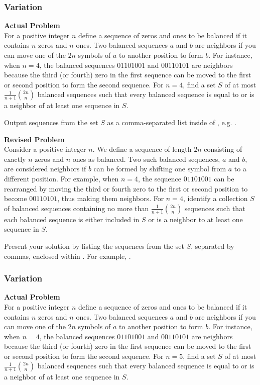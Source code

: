 \subsubsection{Variation}
\textbf{Actual Problem}\\
For a positive integer $n$ define a sequence of zeros and ones to be balanced if it contains $n$ zeros and $n$ ones. 
Two balanced sequences $a$ and $b$ are neighbors if you can move one of the $2n$ symbols of $a$ to another position to form $b$. For instance, when $n = 4$, the balanced sequences $01101001$ and $00110101$ are neighbors because the third (or fourth) zero in the first sequence can be moved to the first or second position to form the second sequence. 
For $n = 4$, find a set $S$ of at most $\frac {1}{n + 1} \binom{2n}{n}$ balanced sequences such that every balanced sequence is equal to or is a neighbor of at least one sequence in $S$.


Output sequences from the set $S$ as a comma-separated list inside of \boxed{}, e.g. .

\textbf{Revised Problem}\\
Consider a positive integer $n$. We define a sequence of length $2n$ consisting of exactly $n$ zeros and $n$ ones as balanced. Two such balanced sequences, $a$ and $b$, are considered neighbors if $b$ can be formed by shifting one symbol from $a$ to a different position. For example, when $n = 4$, the sequence $01101001$ can be rearranged by moving the third or fourth zero to the first or second position to become $00110101$, thus making them neighbors. For $n = 4$, identify a collection $S$ of balanced sequences containing no more than $\frac {1}{n + 1} \binom{2n}{n}$ sequences such that each balanced sequence is either included in $S$ or is a neighbor to at least one sequence in $S$.

Present your solution by listing the sequences from the set $S$, separated by commas, enclosed within \boxed{}. For example, .

\subsubsection{Variation}
\textbf{Actual Problem}\\
For a positive integer $n$ define a sequence of zeros and ones to be balanced if it contains $n$ zeros and $n$ ones. 
Two balanced sequences $a$ and $b$ are neighbors if you can move one of the $2n$ symbols of $a$ to another position to form $b$. For instance, when $n = 4$, the balanced sequences $01101001$ and $00110101$ are neighbors because the third (or fourth) zero in the first sequence can be moved to the first or second position to form the second sequence. 
For $n = 5$, find a set $S$ of at most $\frac {1}{n + 1} \binom{2n}{n}$ balanced sequences such that every balanced sequence is equal to or is a neighbor of at least one sequence in $S$.


